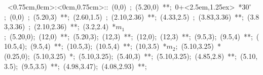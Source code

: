 \hbox{
\xy    <0.75cm,0cm>:<0cm,0.75cm>::
       (0,0) ; (5.20,0) **\dir{-}; 0+<2.5em,1.25ex> *{\hbox{$30^{\circ}$}};
       (0,0) ; (5.20,3) **\dir{-}; 
       (2.60,1.5) ; (2.10,2.36) **\dir{--}; 
       (4.33,2.5) ; (3.83,3.36) **\dir{--}; 
       (3.83,3.36) ; (2.10,2.36) **\dir{--};
	   (3.2,2.4) *{\hbox{$m_{1}$}};                   %
	   (5.20,0); (12,0) **\dir{-};
	   (5.20,3); (12,3) **\dir{-};
	   (12,0); (12,3) **\dir{-};         %
	   (9.5,3); (9.5,4) **\dir{--};
	   (10.5,4); (9.5,4) **\dir{--};
	   (10.5,3); (10.5,4) **\dir{--};
	   (10,3.5) *{\hbox{$m_{2}$}};       %
	   (5.10,3.25) *\cir(0.25,0){};
	   (5.10,3.25) *{\bullet};
	   (5.10,3.25); (5.40,3) **\dir{-};
	   (5.10,3.25); (4.85,2.8) **\dir{-};   %
	   (5.10,3.5); (9.5,3.5) **\dir{-};
	   (4.98,3.47); (4.08,2.93) **\dir{-};
	   \endxy}





